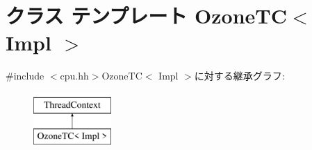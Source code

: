 \hypertarget{classOzoneCPU_1_1OzoneTC}{
\section{クラス テンプレート OzoneTC$<$ Impl $>$}
\label{classOzoneCPU_1_1OzoneTC}
}


{\ttfamily \#include $<$cpu.hh$>$}OzoneTC$<$ Impl $>$に対する継承グラフ:\begin{figure}[H]
\begin{center}
\leavevmode
\includegraphics[height=2cm]{classOzoneCPU_1_1OzoneTC}
\end{center}
\end{figure}
